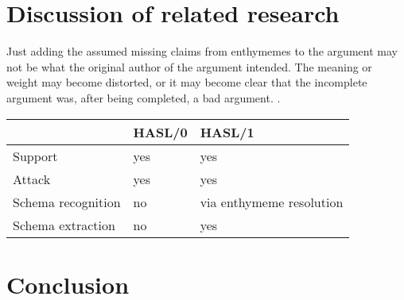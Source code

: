 \documentclass{IOS-Book-Article}
\begin{document}
\section{Discussion of related research}

Just adding the assumed missing claims from enthymemes to the argument may not be what the original author of the argument intended. The meaning or weight may become distorted, or it may become clear that the incomplete argument was, after being completed, a bad argument. \cite{waltonReed2005}. 

\begin{table}
	\begin{tabular}{l|ll|}
		& HASL/0 & HASL/1  \\
		\hline
		Support & yes & yes \\
		Attack & yes & yes \\
		Schema recognition & no & via enthymeme resolution \\
		Schema extraction & no & yes
	\end{tabular}
\end{table}

\section{Conclusion}


%
%
%
%
%
%
%
%
%
%
%
%
%





\end{document}
